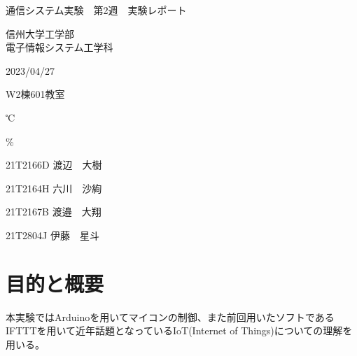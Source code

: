 \documentclass[a4paper,11pt,titlepage,dvipdfmx]{jsarticle}
\begin{document}
\begin{titlepage}
    \noindent 
    \vspace{6cm}
    \begin{center}
    \begin{LARGE}
    通信システム実験　第2週　実験レポート
    \end{LARGE}
    \end{center}
    \vspace{6cm}
    \begin{flushright}
    信州大学工学部\\
    電子情報システム工学科\\
    \begin{description}
        \setlength{\leftskip}{8.9cm}
        \item[　　実験日:] 2023/04/27 
        \item[　実験場所:] W2棟601教室
        \item[　　　気温:] ℃
        \item[　　　湿度:] \%
        \item[　　実験者:] 21T2166D 渡辺　大樹
        \item[共同実験者:] 21T2164H 六川　沙絢
        \item[　　　　　 ] 21T2167B 渡邉　大翔
        \item[　　　　　 ] 21T2804J 伊藤　星斗
    \end{description} 
    \end{flushright}
\end{titlepage}


\section{目的と概要}
本実験ではArduinoを用いてマイコンの制御、また前回用いたソフトであるIFTTTを用いて近年話題となっているIoT(Internet of Things)についての理解を用いる。
\end{document}
